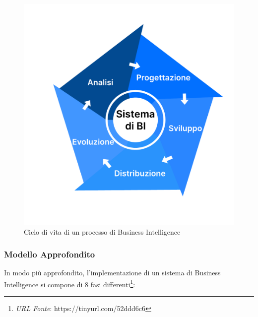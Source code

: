 \begin{figure} [H]
    \centering
    \includegraphics[width=0.75\linewidth]{figure//capitolo_3/Business Intelligence Life Cycle.pdf}
    \caption{Ciclo di vita di un processo di Business Intelligence}
    \label{fig:Business Intelligence Life Cycle}
\end{figure}

\subsubsection{Modello Approfondito}

In modo più approfondito, l'implementazione di un sistema di Business Intelligence si compone di 8 fasi differenti\footnote{\textit{URL Fonte}: https://tinyurl.com/52ddd6c6}:

